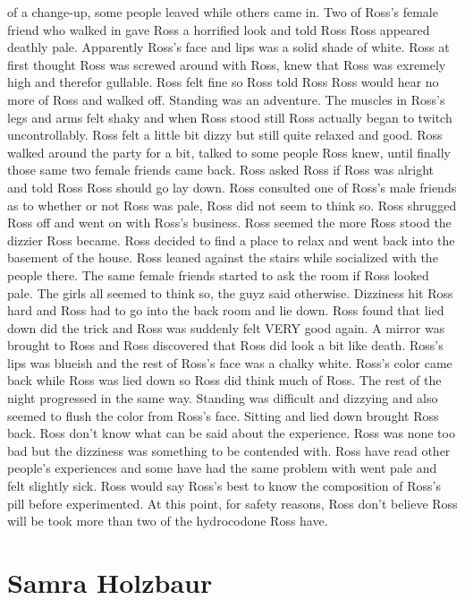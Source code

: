 \documentclass[12pt]{book}
\begin{document}
of a change-up, some people leaved while others came in. Two of Ross's female friend who walked in gave Ross a horrified look and told Ross Ross appeared deathly pale. Apparently Ross's face and lips was a solid shade of white. Ross at first thought Ross was screwed around with Ross, knew that Ross was exremely high and therefor gullable. Ross felt fine so Ross told Ross Ross would hear no more of Ross and walked off. Standing was an adventure. The muscles in Ross's legs and arms felt shaky and when Ross stood still Ross actually began to twitch uncontrollably. Ross felt a little bit dizzy but still quite relaxed and good. Ross walked around the party for a bit, talked to some people Ross knew, until finally those same two female friends came back. Ross asked Ross if Ross was alright and told Ross Ross should go lay down. Ross consulted one of Ross's male friends as to whether or not Ross was pale, Ross did not seem to think so. Ross shrugged Ross off and went on with Ross's business. Ross seemed the more Ross stood the dizzier Ross became. Ross decided to find a place to relax and went back into the basement of the house. Ross leaned against the stairs while socialized with the people there. The same female friends started to ask the room if Ross looked pale. The girls all seemed to think so, the guyz said otherwise. Dizziness hit Ross hard and Ross had to go into the back room and lie down. Ross found that lied down did the trick and Ross was suddenly felt VERY good again. A mirror was brought to Ross and Ross discovered that Ross did look a bit like death. Ross's lips was blueish and the rest of Ross's face was a chalky white. Ross's color came back while Ross was lied down so Ross did think much of Ross. The rest of the night progressed in the same way. Standing was difficult and dizzying and also seemed to flush the color from Ross's face. Sitting and lied down brought Ross back. Ross don't know what can be said about the experience. Ross was none too bad but the dizziness was something to be contended with. Ross have read other people's experiences and some have had the same problem with went pale and felt slightly sick. Ross would say Ross's best to know the composition of Ross's pill before experimented. At this point, for safety reasons, Ross don't believe Ross will be took more than two of the hydrocodone Ross have.



\chapter{Samra Holzbaur}
\end{document}

